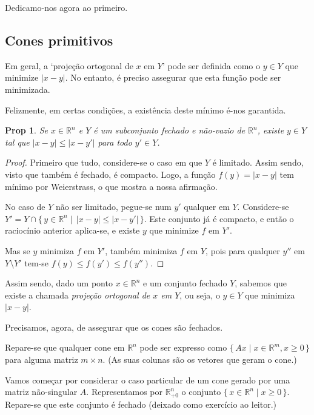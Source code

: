 \documentclass{article}
\newcommand{\R}{\mathbb{R}}
\newtheorem{prop}{Prop}
\theoremstyle{definition}
\begin{document}
	Dedicamo-nos agora ao primeiro.
	
	\subsection{Cones primitivos}
	
	Em geral, a `projeção ortogonal de $x$ em $Y$' pode ser definida como o $y \in Y$ que minimize $\lvert x - y \rvert$. No entanto, é preciso assegurar que esta função pode ser minimizada.
	
	Felizmente, em certas condições, a existência deste mínimo é-nos garantida.
	
	\begin{prop}
	Se $x \in \R^n$ e $Y$ é um subconjunto fechado e não-vazio de $\R^n$, existe $y \in Y$ tal que $\lvert x - y \rvert \leq \lvert x - y' \rvert$ para todo $y' \in Y$.
	\end{prop}
	
	\begin{proof}
	Primeiro que tudo, considere-se o caso em que $Y$ é limitado. Assim sendo, visto que também é fechado, é compacto. Logo, a função $f(y) = \rvert x - y \lvert$ tem mínimo por Weierstrass, o que mostra a nossa afirmação.
	
	No caso de $Y$ não ser limitado, pegue-se num $y'$ qualquer em $Y$. Considere-se $Y' = Y \cap \{\, y \in \R^n \mid \, \rvert x - y \lvert \leq \rvert x - y' \lvert \,\}$. Este conjunto já é compacto, e então o raciocínio anterior aplica-se, e existe $y$ que minimize $f$ em $Y'$.
	
	Mas se $y$ minimiza $f$ em $Y'$, também minimiza $f$ em $Y$, pois para qualquer $y''$ em $Y \setminus Y'$ tem-se $f(y) \leq f(y') \leq f(y'')$.
	\end{proof}
	
	Assim sendo, dado um ponto $x \in \R^n$ e um conjunto fechado $Y$, sabemos que existe a chamada \emph{projeção ortogonal de $x$ em $Y$}, ou seja, o $y \in Y$ que minimiza $\rvert x - y \lvert$.
	
	Precisamos, agora, de assegurar que os cones são fechados.
	
	Repare-se que qualquer cone em $\R^n$ pode ser expresso como $\{\,Ax \mid x \in \R^m, x \geq 0\,\}$ para alguma matriz $m \times n$. (As suas colunas são os vetores que geram o cone.)
	
	Vamos começar por considerar o caso particular de um cone gerado por uma matriz não-singular $A$. Representamos por $\R^n_{+0}$ o conjunto $\{\,x \in \R^n \mid x \geq 0\,\}$. Repare-se que este conjunto é fechado (deixado como exercício ao leitor.)
	
\end{document}
